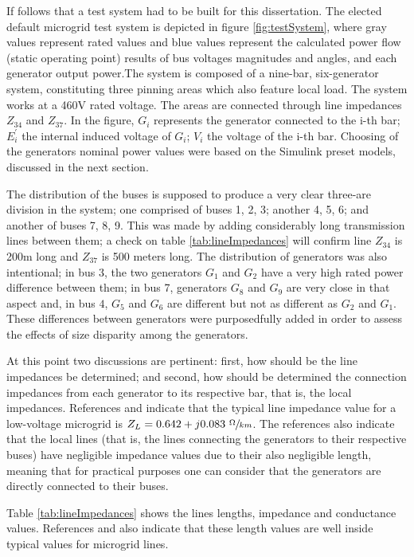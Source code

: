 	If follows that a test system had to be built for this dissertation. The elected default microgrid test system is depicted in figure \ref{fig:testSystem}, where gray values represent rated values and blue values represent the calculated power flow (static operating point) results of bus voltages magnitudes and angles, and each generator output power.The system is composed of a nine-bar, six-generator system, constituting three pinning areas which also feature local load. The system works at a 460V rated voltage. The areas are connected through line impedances $Z_{34}$ and $Z_{37}$. In the figure, $G_{i}$ represents the generator connected to the i-th bar; $E^\prime_{i}$ the internal induced voltage of $G_{i}$; $V_{i}$ the voltage of the i-th bar. Choosing of the generators nominal power values were based on the Simulink preset models, discussed in the next section.

	The distribution of the buses is supposed to produce a very clear three-are division in the system; one comprised of buses 1, 2, 3; another 4, 5, 6; and another of buses 7, 8, 9. This was made by adding considerably long transmission lines between them; a check on table \ref{tab:lineImpedances} will confirm line $Z_{34}$ is 200m long and $Z_{37}$ is 500 meters long. The distribution of generators was also intentional; in bus 3, the two generators $G_1$ and $G_2$ have a very high rated power difference between them; in bus 7, generators $G_8$ and $G_9$ are very close in that aspect and, in bus $4$, $G_5$ and $G_6$ are different but not as different as $G_2$ and $G_1$. These differences between generators were purposedfully added in order to assess the effects of size disparity among the generators. 

	At this point two discussions are pertinent: first, how should be the line impedances be determined; and second, how should be determined the connection impedances from each generator to its respective bar, that is, the local impedances. References \cite{Vasquez2016} and \cite{Pogaku2007} indicate that the typical line impedance value for a low-voltage microgrid is $Z_L = 0.642 + j0.083\ \sfrac{\Omega}{km}$. The references also indicate that the local lines (that is, the lines connecting the generators to their respective buses) have negligible impedance values due to their also negligible length, meaning that for practical purposes one can consider that the generators are directly connected to their buses.

	Table \ref{tab:lineImpedances} shows the lines lengths, impedance and conductance values. References \cite{Vasquez2016} and \cite{Pogaku2007} also indicate that these length values are well inside typical values for microgrid lines.

